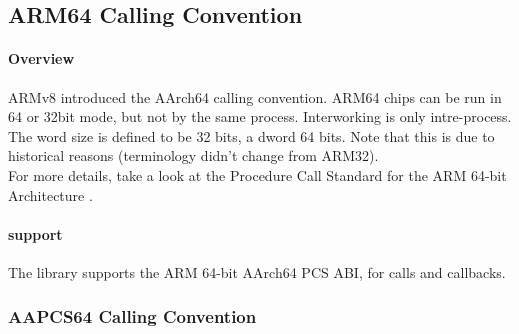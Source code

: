 %
%
%
%

\subsection{ARM64 Calling Convention}

\paragraph{Overview}

ARMv8 introduced the AArch64 calling convention. ARM64 chips can be run in 64 or 32bit mode, but not by the same process. Interworking is only intre-process.\\
The word size is defined to be 32 bits, a dword 64 bits. Note that this is due to historical reasons (terminology
didn't change from ARM32).\\
For more details, take a look at the Procedure Call Standard for the ARM 64-bit Architecture \cite{AAPCS64}.\\

\paragraph{ support}

The  library supports the ARM 64-bit AArch64 PCS ABI, for calls and callbacks.

\subsubsection{AAPCS64 Calling Convention}

